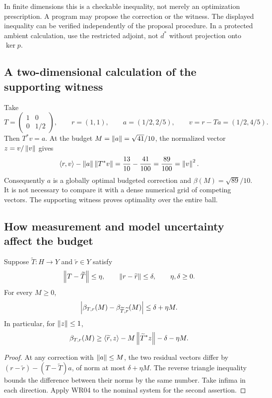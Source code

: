 In finite dimensions this is a checkable inequality, not merely an optimization prescription. A program may propose the correction or the witness. The displayed inequality can be verified independently of the proposal procedure. In a protected ambient calculation, use the restricted adjoint, not $d^*$ without projection onto $\ker p$.

\subsection{A two-dimensional calculation of the supporting witness}
Take
\[
 T=\begin{pmatrix}1&0\\0&1/2\end{pmatrix},\qquad r=(1,1),\qquad
 a=(1/2,2/5),\qquad v=r-Ta=(1/2,4/5).
\]
Then $T^*v=a$. At the budget $M=\left\lVert a\right\rVert=\sqrt{41}/10$, the normalized vector $z=v/\left\lVert v\right\rVert$ gives
\[
 \langle r,v\rangle-\left\lVert a\right\rVert\left\lVert T^*v\right\rVert
 =\frac{13}{10}-\frac{41}{100}=\frac{89}{100}=\left\lVert v\right\rVert^2.
\]
Consequently $a$ is a globally optimal budgeted correction and $\beta(M)=\sqrt{89}/10$. It is not necessary to compare it with a dense numerical grid of competing vectors. The supporting witness proves optimality over the entire ball.


\subsection{How measurement and model uncertainty affect the budget}
\begin{theorem}\label{WR05}
Suppose $\widetilde T:H\to Y$ and $\widetilde r\in Y$ satisfy
\[
 \left\lVert T-\widetilde T\right\rVert\le\eta,\qquad
 \left\lVert r-\widetilde r\right\rVert\le\delta,\qquad\eta,\delta\ge0.
\]
For every $M\ge0$,
\[
 \left\lvert\beta_{T,r}(M)-\beta_{\widetilde T,\widetilde r}(M)\right\rvert
 \le\delta+\eta M.
\]
In particular, for $\left\lVert z\right\rVert\le1$,
\[
 \beta_{T,r}(M)\ge
 \langle\widetilde r,z\rangle-M\left\lVert\widetilde T^*z\right\rVert
       -\delta-\eta M.
\]
\end{theorem}
\begin{proof}
At any correction with $\left\lVert a\right\rVert\le M$, the two residual vectors differ by
$(r-\widetilde r)-(T-\widetilde T)a$, of norm at most $\delta+\eta M$. The reverse triangle inequality bounds the difference between their norms by the same number. Take infima in each direction. Apply WR04 to the nominal system for the second assertion.
\end{proof}

